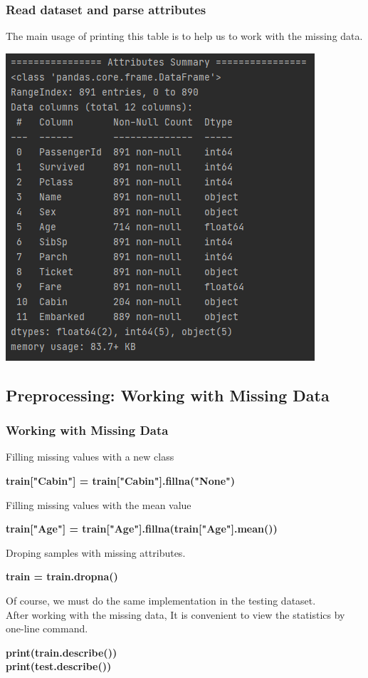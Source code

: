 \documentclass{beamer}
\begin{document}
\begin{frame}
	\frametitle{Read dataset and parse attributes}
	\begin{flushleft}
		The main usage of printing this table is to help us to work with the missing data.
	\end{flushleft}
	\begin{center}
		\includegraphics[width=0.55\linewidth]{./src/figures/1.png}
	\end{center}
\end{frame}

\subsection{Preprocessing: Working with Missing Data}
\begin{frame}
	\frametitle{Working with Missing Data}
	\begin{flushleft}
		Filling missing values with a new class
	\end{flushleft}
	\begin{center}
		\textbf{\color{blue}train["Cabin"] = train["Cabin"].fillna("None")}
	\end{center}
	\begin{flushleft}
		Filling missing values with the mean value
	\end{flushleft}
	\begin{center}
		\textbf{\color{blue}train["Age"] = train["Age"].fillna(train["Age"].mean())}
	\end{center}
	\begin{flushleft}
		Droping samples with missing attributes.
	\end{flushleft}
	\begin{center}
		\textbf{\color{blue}train = train.dropna()}
	\end{center}
	\begin{flushleft}
		Of course, we must do the same implementation in the testing dataset. \\
		After working with the missing data, It is convenient to view the statistics by one-line command.
	\end{flushleft}
	\begin{center}
		\textbf{\color{blue}print(train.describe()) \\ print(test.describe())}
	\end{center}
\end{frame}
\end{document}
